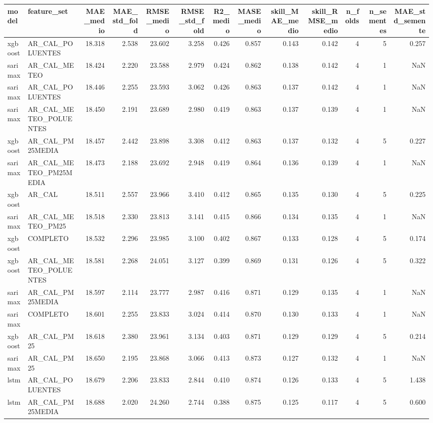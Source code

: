 \begin{tabular}{llrrrrrrrrrrr}
\toprule
model & feature_set & MAE_medio & MAE_std_fold & RMSE_medio & RMSE_std_fold & R2_medio & MASE_medio & skill_MAE_medio & skill_RMSE_medio & n_folds & n_sementes & MAE_std_semente \\
\midrule
xgboost & AR_CAL_POLUENTES & 18.318 & 2.538 & 23.602 & 3.258 & 0.426 & 0.857 & 0.143 & 0.142 & 4 & 5 & 0.257 \\
sarimax & AR_CAL_METEO & 18.424 & 2.220 & 23.588 & 2.979 & 0.424 & 0.862 & 0.138 & 0.142 & 4 & 1 & NaN \\
sarimax & AR_CAL_POLUENTES & 18.446 & 2.255 & 23.593 & 3.062 & 0.426 & 0.863 & 0.137 & 0.142 & 4 & 1 & NaN \\
sarimax & AR_CAL_METEO_POLUENTES & 18.450 & 2.191 & 23.689 & 2.980 & 0.419 & 0.863 & 0.137 & 0.139 & 4 & 1 & NaN \\
xgboost & AR_CAL_PM25MEDIA & 18.457 & 2.442 & 23.898 & 3.308 & 0.412 & 0.863 & 0.137 & 0.132 & 4 & 5 & 0.227 \\
sarimax & AR_CAL_METEO_PM25MEDIA & 18.473 & 2.188 & 23.692 & 2.948 & 0.419 & 0.864 & 0.136 & 0.139 & 4 & 1 & NaN \\
xgboost & AR_CAL & 18.511 & 2.557 & 23.966 & 3.410 & 0.412 & 0.865 & 0.135 & 0.130 & 4 & 5 & 0.225 \\
sarimax & AR_CAL_METEO_PM25 & 18.518 & 2.330 & 23.813 & 3.141 & 0.415 & 0.866 & 0.134 & 0.135 & 4 & 1 & NaN \\
xgboost & COMPLETO & 18.532 & 2.296 & 23.985 & 3.100 & 0.402 & 0.867 & 0.133 & 0.128 & 4 & 5 & 0.174 \\
xgboost & AR_CAL_METEO_POLUENTES & 18.581 & 2.268 & 24.051 & 3.127 & 0.399 & 0.869 & 0.131 & 0.126 & 4 & 5 & 0.322 \\
sarimax & AR_CAL_PM25MEDIA & 18.597 & 2.114 & 23.777 & 2.987 & 0.416 & 0.871 & 0.129 & 0.135 & 4 & 1 & NaN \\
sarimax & COMPLETO & 18.601 & 2.255 & 23.833 & 3.024 & 0.414 & 0.870 & 0.130 & 0.133 & 4 & 1 & NaN \\
xgboost & AR_CAL_PM25 & 18.618 & 2.380 & 23.961 & 3.134 & 0.403 & 0.871 & 0.129 & 0.129 & 4 & 5 & 0.214 \\
sarimax & AR_CAL_PM25 & 18.650 & 2.195 & 23.868 & 3.066 & 0.413 & 0.873 & 0.127 & 0.132 & 4 & 1 & NaN \\
lstm & AR_CAL_POLUENTES & 18.679 & 2.206 & 23.833 & 2.844 & 0.410 & 0.874 & 0.126 & 0.133 & 4 & 5 & 1.438 \\
lstm & AR_CAL_PM25MEDIA & 18.688 & 2.020 & 24.260 & 2.744 & 0.388 & 0.875 & 0.125 & 0.117 & 4 & 5 & 0.600 \\

\end{tabular}
